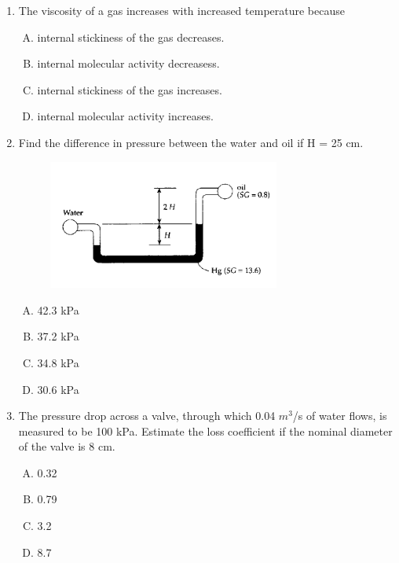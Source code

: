 \documentclass[12pt]{article}
\begin{document}
\begin{enumerate}
\item The viscosity of a gas increases with increased temperature because

\begin{enumerate}[A)]
\item internal stickiness of the gas decreases.
\item internal molecular activity decreasess.
\item internal stickiness of the gas increases.
\item internal molecular activity increases.
\end{enumerate}


\item Find the difference in pressure between the water and oil if H = 25 cm. 

\begin{figure}[htbp] %
   \centering
   \includegraphics[width=3in]{manometer.png} 
   \caption{}
   \label{fig:manometer}
\end{figure}

\begin{enumerate}[A)]
\item 42.3 kPa
\item 37.2 kPa
\item 34.8 kPa
\item 30.6 kPa
\end{enumerate}

\item The pressure drop across a valve, through which 0.04 $m^3$/s of water flows, is measured to be 100 kPa. Estimate the loss coefficient if the nominal diameter of the valve is 8 cm.
\begin{enumerate}[A)]
\item 0.32
\item 0.79
\item 3.2
\item 8.7
\end{enumerate}
\clearpage



\end{enumerate}
\end{document}
